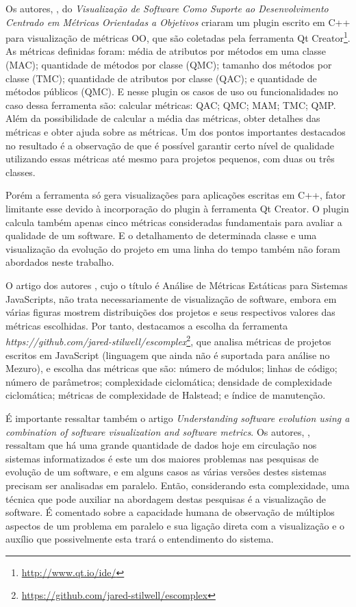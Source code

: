 Os autores, , do \textit{Visualização de Software
Como Suporte ao Desenvolvimento Centrado em Métricas Orientadas a Objetivos}
criaram um plugin escrito em C++ para visualização de métricas OO, que são
coletadas pela ferramenta Qt Creator\footnote{\url{http://www.qt.io/ide/}}. As
métricas definidas foram: média de atributos por métodos em uma classe (MAC);
quantidade de métodos por classe (QMC); tamanho dos métodos por classe (TMC);
quantidade de atributos por classe (QAC); e quantidade de métodos públicos
(QMC). E nesse plugin os casos de uso ou funcionalidades no caso dessa
ferramenta são: calcular métricas: QAC; QMC; MAM; TMC; QMP. Além da
possibilidade de calcular a média das métricas, obter detalhes das métricas e
obter ajuda sobre as métricas. Um dos pontos importantes destacados no
resultado é a observação de que é possível garantir certo nível de qualidade
utilizando essas métricas até mesmo para projetos pequenos, com duas ou três
classes.

Porém a ferramenta só gera visualizações para aplicações escritas em C++, fator
limitante esse devido à incorporação do plugin à ferramenta Qt Creator. O
plugin calcula também apenas cinco métricas consideradas fundamentais para
avaliar a qualidade de um software. E o detalhamento de determinada classe e
uma visualização da evolução do projeto em uma linha do tempo também não foram
abordados neste trabalho.

O artigo dos autores , cujo o título é Análise de
Métricas Estáticas para Sistemas JavaScripts, não trata necessariamente de
visualização de software, embora em várias figuras mostrem distribuições dos
projetos e seus respectivos valores das métricas escolhidas. Por tanto,
destacamos a escolha da ferramenta 
\textit{https://github.com/jared-stilwell/escomplex}\footnote{\url{https://github.com/jared-stilwell/escomplex}},
que analisa métricas de projetos escritos em JavaScript (linguagem que ainda
não é suportada para análise no Mezuro), e escolha das métricas que são: número
de módulos; linhas de código; número de parâmetros; complexidade ciclomática;
densidade de complexidade ciclomática; métricas de complexidade de Halstead; e
índice de manutenção.

É importante ressaltar também o artigo \textit{Understanding software evolution
using a combination of software visualization and software metrics}. Os
autores, , ressaltam que há uma grande
quantidade de dados hoje em circulação nos sistemas informatizados é este um
dos maiores problemas nas pesquisas de evolução de um software, e em alguns
casos as várias versões destes sistemas precisam ser analisadas em paralelo.
Então, considerando esta complexidade, uma técnica que pode auxiliar na
abordagem destas pesquisas é a visualização de software. É comentado sobre a
capacidade humana de observação de múltiplos aspectos de um problema em
paralelo e sua ligação direta com a visualização e o auxílio que possivelmente
esta trará o entendimento do sistema.

